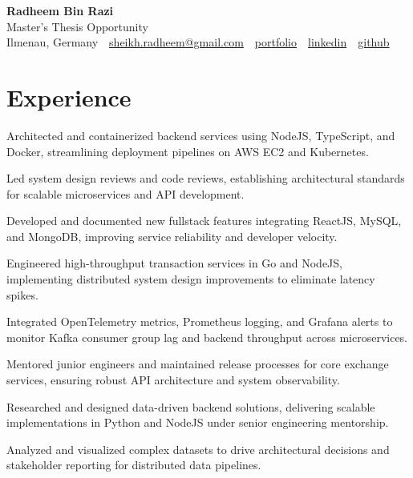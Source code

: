 \documentclass[10pt,a4paper]{resume}
\makeatletter
\newcommand{\Portfolio}{https://radheem.github.io/my-cv}
\newcommand{\PortfolioText}{portfolio}
\newcommand{\GitHub}{https://github.com/radheem}
\newcommand{\LinkedIn}{https://www.linkedin.com/in/radheem-razi}
\newcommand{\Email}{sheikh.radheem@gmail.com}
\makeatother
\begin{document}
\begin{center}
  {\huge\bfseries Radheem Bin Razi}\\[3pt]
  {\large Master's Thesis Opportunity}\\[6pt]
  \small
  Ilmenau, Germany \,\textbar\,
  \href{mailto:\Email}{\Email} \,\textbar\,
  \href{\Portfolio}{\PortfolioText} \,\textbar\,
  \href{\LinkedIn}{linkedin} \,\textbar\,
  \href{\GitHub}{github}
\end{center}
\vspace{2pt}

\section{Experience}

\bullets
  \item Architected and containerized backend services using NodeJS, TypeScript, and Docker, streamlining deployment pipelines on AWS EC2 and Kubernetes.
  \item Led system design reviews and code reviews, establishing architectural standards for scalable microservices and API development.
  \item Developed and documented new fullstack features integrating ReactJS, MySQL, and MongoDB, improving service reliability and developer velocity.
\bulletsend
\vspace{1.5pt}
\bullets
  \item Engineered high-throughput transaction services in Go and NodeJS, implementing distributed system design improvements to eliminate latency spikes.
  \item Integrated OpenTelemetry metrics, Prometheus logging, and Grafana alerts to monitor Kafka consumer group lag and backend throughput across microservices.
  \item Mentored junior engineers and maintained release processes for core exchange services, ensuring robust API architecture and system observability.
\bulletsend
\vspace{1.5pt}
\bullets
  \item Researched and designed data-driven backend solutions, delivering scalable implementations in Python and NodeJS under senior engineering mentorship.
  \item Analyzed and visualized complex datasets to drive architectural decisions and stakeholder reporting for distributed data pipelines.
\bulletsend
\vspace{1.5pt}
\end{document}
